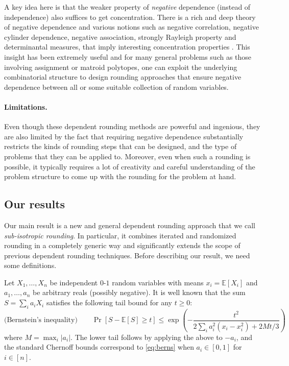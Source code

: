 \documentclass{toc}
\newcommand{\E}{\mathbb{E}}
\begin{document}
A key idea here is that the weaker property of
\emph{negative} dependence (instead of independence) also suffices to get concentration. There is a rich and deep theory of
negative dependence and various notions such as negative correlation, negative cylinder dependence,
negative association, strongly Rayleigh property and determinantal measures, that imply interesting concentration properties \cite{Pem00, BBL09, DP09}.
This insight has been extremely useful and for many general problems such as those involving assignment or matroid polytopes, one can exploit the underlying combinatorial structure to design rounding approaches that ensure negative dependence between all or some  suitable collection of random variables.

\paragraph{Limitations.} Even though these dependent rounding methods are powerful and ingenious, they are also limited by the fact that requiring negative dependence substantially restricts the kinds of rounding steps that can be designed, and the type of problems that they can be applied to.
Moreover, even when such a rounding is possible, it typically requires a lot of creativity and careful understanding of the problem structure to come up with the rounding for the problem at hand.

\subsection{Our results}
%
%
%

Our main result is a new and general dependent rounding approach that we call \emph{sub-isotropic rounding}. In particular, it combines iterated and randomized rounding in a completely generic way and significantly extends
the scope of previous dependent rounding techniques.
Before describing our result, we need some definitions.

Let $X_1,\ldots,X_n$ be  independent $0$-$1$ random variables with means $x_i = \E[X_i]$ and $a_1,\ldots,a_n$ be arbitrary reals (possibly negative). It is well known \cite{BLM13} that the sum
$S =\sum_i a_i X_i$ satisfies the following tail bound for any $t\geq 0$:
\begin{equation}
\label{eq:berns}
\text{(Bernstein's inequality)}  \quad \quad \Pr[ S - \E[S] \geq t] \leq \exp\left(-\frac{t^2}{2\sum_i a_i^2(x_i-x_i^2) + 2Mt/3}\right)
 \end{equation}
where $M = \max_{i} |a_i|$. The lower tail follows by applying the above to $-a_i$, and the standard Chernoff bounds correspond to \eqref{eq:berns} when $a_i\in[0,1]$ for $i\in [n]$.
\end{document}
